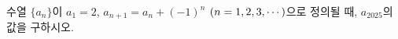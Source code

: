 수열 $\{a_n\}$이 $a_1=2$, $a_{n+1}=a_n+(-1)^n$ $(n=1{,}\mkern3mu\mathopen{}2{,}\mkern3mu\mathopen{}3{,}\mkern3mu\mathopen{}\cdots)$으로 정의될 때, $a_{2025}$의 값을 구하시오.
